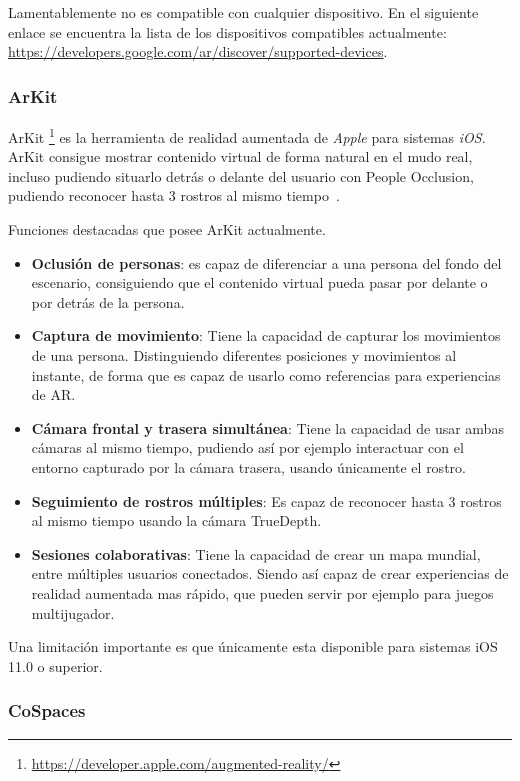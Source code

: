 Lamentablemente no es compatible con cualquier dispositivo. En el siguiente enlace se encuentra la lista de los dispositivos compatibles actualmente: \url{https://developers.google.com/ar/discover/supported-devices}.

\subsubsection{ArKit}

ArKit \footnote{\url{https://developer.apple.com/augmented-reality/}} es la herramienta de realidad aumentada de \textit{Apple} para sistemas \textit{iOS}. ArKit consigue mostrar contenido virtual de forma natural en el mudo real, incluso pudiendo situarlo detrás o delante del usuario con People Occlusion, pudiendo reconocer hasta 3 rostros al mismo tiempo~\cite{apple_inc}.

Funciones destacadas que posee ArKit actualmente.

\begin{itemize}
	\item \textbf{Oclusión de personas}: es capaz de diferenciar a una persona del fondo del escenario, consiguiendo que el contenido virtual  pueda pasar por delante o por detrás de la persona.
	\item \textbf{Captura de movimiento}: Tiene la capacidad de capturar los movimientos de una persona. Distinguiendo diferentes posiciones y movimientos al instante, de forma que es capaz de usarlo como referencias para experiencias de AR.
	\item \textbf{Cámara frontal y trasera simultánea}: Tiene la capacidad de usar ambas cámaras al mismo tiempo, pudiendo así por ejemplo interactuar con el entorno capturado por la cámara trasera, usando únicamente el rostro.
	\item \textbf{Seguimiento de rostros múltiples}: Es capaz de reconocer hasta 3 rostros al mismo tiempo usando la cámara TrueDepth.
	\item \textbf{Sesiones colaborativas}: Tiene la capacidad de crear un mapa mundial, entre múltiples usuarios conectados. Siendo así capaz de crear experiencias de realidad aumentada mas rápido, que pueden servir por ejemplo para juegos multijugador.
\end{itemize}



Una limitación importante es que únicamente esta disponible para sistemas iOS 11.0 o superior.


\subsubsection{CoSpaces}\label{sub:Def_cospace} 

